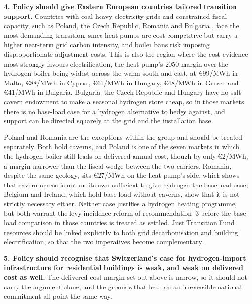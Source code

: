 \textbf{4. Policy should give Eastern European countries tailored transition support.}
Countries with coal-heavy electricity grids and constrained fiscal capacity, such as
Poland, the Czech Republic, Romania and Bulgaria \citep{EMBER2024electricity,
EEA2023fit55}, face the most demanding transition, since heat pumps are cost-competitive
but carry a higher near-term grid carbon intensity, and boiler bans risk imposing
disproportionate adjustment costs. This is also the region where the cost evidence most
strongly favours electrification, the heat pump's 2050 margin over the hydrogen boiler
being widest across the warm south and east, at \euro{}99/MWh in Malta, \euro{}88/MWh in
Cyprus, \euro{}61/MWh in Hungary, \euro{}48/MWh in Greece and \euro{}41/MWh in Bulgaria.
Bulgaria, the Czech Republic and Hungary have no salt-cavern endowment to make a
seasonal hydrogen store cheap, so in those markets there is no base-load case for a
hydrogen alternative to hedge against, and support can be directed squarely at the grid
and the installation base.

Poland and Romania are the exceptions within the group and should be treated separately.
Both hold caverns, and Poland is one of the seven markets in which the hydrogen boiler
still leads on delivered annual cost, though by only \euro{}2/MWh, a margin narrower
than the fiscal wedge between the two carriers. Romania, despite the same geology, sits
\euro{}27/MWh on the heat pump's side, which shows that cavern access is not on its own
sufficient to give hydrogen the base-load case; Belgium and Ireland, which hold base
load without caverns, show that it is not strictly necessary either. Neither case
justifies a hydrogen heating programme, but both warrant the levy-incidence reform of
recommendation~3 before the base-load comparison in those countries is treated as
settled. Just Transition Fund resources should be linked explicitly to both grid
decarbonisation and building electrification, so that the two imperatives become
complementary.

\textbf{5. Policy should recognise that Switzerland's case for hydrogen-import
infrastructure for residential buildings is weak, and weak on delivered cost as well.}
The delivered-cost margin set out above is narrow, so it should not carry the argument
alone, and the grounds that bear on an irreversible national commitment all point the
same way.

